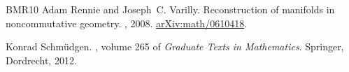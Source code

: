 \documentclass[12pt,a4paper,twoside,reqno]{amsart}
\theoremstyle{plain}
\theoremstyle{definition}
\theoremstyle{remark} %
\theoremstyle{plain}
\numberwithin{equation}{section}
\begin{document}
\begin{thebibliography}{BMR10}
Adam Rennie and Joseph~C. Varilly.
\newblock Reconstruction of manifolds in noncommutative geometry.
, 2008.
\newblock \href{https://arxiv.org/abs/math/0610418#}{arXiv:math/0610418}.

Konrad Schm\"{u}dgen.
, volume 265
  of {\em Graduate Texts in Mathematics}.
\newblock Springer, Dordrecht, 2012.

\end{thebibliography}






%
%
\end{document}
